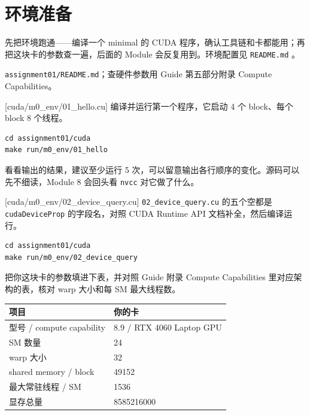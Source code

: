\documentclass[11pt,a4paper,fontset=none]{ctexart}
\begin{document}
\setcounter{section}{-1}

\section{环境准备}

先把环境跑通——编译一个 minimal 的 CUDA 程序，确认工具链和卡都能用；再把这块卡的参数查一遍，后面的 Module 会反复用到。环境配置见 \texttt{README.md} 。

\begin{reading}
\texttt{assignment01/README.md}；查硬件参数用 Guide 第五部分附录 Compute Capabilities。
\end{reading}

[cuda/m0\_env/01\_hello.cu]
编译并运行第一个程序，它启动 4 个 block、每个 block 8 个线程。

\begin{lstlisting}
cd assignment01/cuda
make run/m0_env/01_hello
\end{lstlisting}

看看输出的结果，建议至少运行 5 次，可以留意输出各行顺序的变化。源码可以先不细读，Module 8 会回头看 \texttt{nvcc} 对它做了什么。

[cuda/m0\_env/02\_device\_query.cu]
\texttt{02\_device\_query.cu} 的五个空都是 \texttt{cudaDeviceProp} 的字段名，对照 CUDA Runtime API 文档补全，然后编译运行。

\begin{lstlisting}
cd assignment01/cuda
make run/m0_env/02_device_query
\end{lstlisting}

把你这块卡的参数填进下表，并对照 Guide 附录 Compute Capabilities 里对应架构的表，核对 warp 大小和每 SM 最大线程数。

\begin{center}\small
\begin{tabular}{@{}ll@{}}
\toprule
项目 & 你的卡 \\
\midrule
型号 / compute capability & 8.9 / RTX 4060 Laptop GPU \\
SM 数量 & 24 \\
warp 大小 & 32 \\
shared memory / block & 49152 \\
最大常驻线程 / SM & 1536 \\
显存总量 & 8585216000 \\
\bottomrule
\end{tabular}
\end{center}
\end{document}
